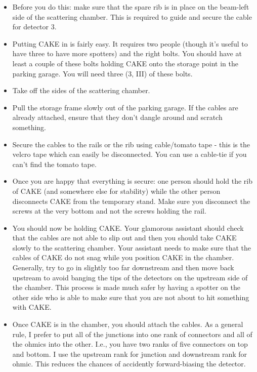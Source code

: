 \documentclass[11pt]{report}
\begin{document}
\begin{itemize}

\item Before you do this: make sure that the spare rib is in place on the beam-left side of the scattering chamber. This is required to guide and secure the cable for detector 3.

\item Putting CAKE in is fairly easy. It requires two people (though it's useful to have three to have more spotters) and the right bolts. You should have at least a couple of these bolts holding CAKE onto the storage point in the parking garage. You will need three (3, III) of these bolts.

\item Take off the sides of the scattering chamber.

\item Pull the storage frame slowly out of the parking garage. If the cables are already attached, ensure that they don’t dangle around and scratch something.

\item Secure the cables to the rails or the rib using cable/tomato tape - this is the velcro tape which can easily be disconnected. You can use a cable-tie if you can’t find the tomato tape.

\item Once you are happy that everything is secure: one person should hold the rib of CAKE (and somewhere else for stability) while the other person disconnects CAKE from the temporary stand. Make sure you disconnect the screws at the very bottom and not the screws holding the rail.

\item You should now be holding CAKE. Your glamorous assistant should check that the cables are not able to slip out and then you should take CAKE slowly to the scattering chamber. Your assistant needs to make sure that the cables of CAKE do not snag while you position CAKE in the chamber. Generally, try to go in slightly too far downstream and then move back upstream to avoid banging the tips of the detectors on the upstream side of the chamber. This process is made much safer by having a spotter on the other side who is able to make sure that you are not about to hit something with CAKE.

\item Once CAKE is in the chamber, you should attach the cables. As a general rule, I prefer to put all of the junctions into one rank of connectors and all of the ohmics into the other. I.e., you have two ranks of five connectors on top and bottom. I use the upstream rank for junction and downstream rank for ohmic. This reduces the chances of accidently forward-biasing the detector.


\end{itemize}
\end{document}
